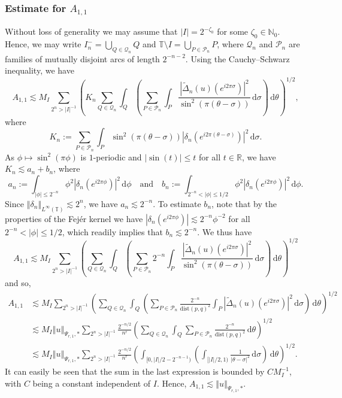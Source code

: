 \documentclass[a4paper, leqno, 10pt]{amsart}
\numberwithin{equation}{section}
\newcommand{\dd}{\mathrm{d}}
\newcommand{\T}{\mathbb{T}}
\newcommand{\R}{\mathbb{R}}
\newcommand{\norm}[1]{\left\Vert#1\right\Vert}
\newcommand{\abs}[1]{\left|#1\right|}
\newcommand{\N}{\mathbb{N}}
\begin{document}
\subsubsection*{Estimate for $A_{1,1}$}
%
Without loss of generality we may assume that $| I | = 2^{-\zeta_0}$ for some $\zeta_0 \in \N_0$. Hence, we may write $ I_n^- = \bigcup_{Q \in \mathcal{Q}_n} Q$ and $ \T \setminus I = \bigcup_{P \in \mathcal{P}_n} P$, where $\mathcal{Q}_n$ and $\mathcal{P}_n$ are families of mutually disjoint arcs of length $2^{-n-2}$. Using the Cauchy--Schwarz inequality, 
we have 
\[
A_{1,1}  \lesssim  
M_I  \sum_{ 2^n > | I |^{-1} }  \left( K_n  \sum_{Q \in \mathcal{Q}_n } \int_Q  \left( \sum_{P \in \mathcal{P}_n } \int_P \frac{ \abs{ \widetilde{\Delta}_n (u) (e^{i 2 \pi \sigma}) }^2 }{ \sin^2 (   \pi (\theta-\sigma) ) } \, \dd \sigma \right)   \, \dd \theta \right)^{1/2} ,
\] 
where
\[
K_n:=  \sum_{P \in \mathcal{P}_n }  \int_P \sin^2 (   \pi (\theta-\sigma) ) \abs{ \delta_n \left( e^{i 2 \pi (\theta - \sigma )} \right) }^2 \, \dd \sigma .
\]
As $\phi \mapsto \sin^2 (   \pi \phi )$ is $1$-periodic and $|\sin (t)| \leq t$ for all $t \in \R$, we have $
K_n \lesssim a_n + b_n $, 
where
\[
a_n := \int_{ | \phi | \leq 2^{-n} }  \phi^2  \abs{ \delta_n \left( e^{i 2 \pi \phi } \right) }^2 \, \dd \phi   \quad \text{and} \quad
b_n :=  \int_{ 2^{-n} <  | \phi | \leq  1/2 }  \phi^2  \abs{ \delta_n \left( e^{i 2 \pi \phi } \right) }^2 \, \dd \phi  .
\]
Since $\norm{\delta_n}_{L^{\infty}(\T)} \lesssim 2^n $, we have
$ 
a_n \lesssim  2^{-n}$.
To estimate $b_n$, note that by the properties of the Fej\'er kernel we have $ \abs{ \delta_n \left( e^{i 2 \pi \phi } \right) } \lesssim 2^{-n}  \phi^{-2} $ for all $2^{-n} <  | \phi | \leq  1/2$, 
which readily implies that $b_n \lesssim  2^{-n}$. We thus have
\[
A_{1,1} \lesssim
M_I \sum_{ 2^n > | I |^{-1} }  \left( \sum_{Q \in \mathcal{Q}_n }   \int_Q  \left( \sum_{P \in \mathcal{P}_n } 2^{-n} \int_P \frac{ \abs{ \widetilde{\Delta}_n (u) (e^{i 2 \pi \sigma}) }^2 }{ \sin^2 (   \pi (\theta-\sigma) ) } \, \dd \sigma \right) \, \dd \theta \right)^{1/2} 
\]
and so,
\begin{align*}
A_{1,1} & \lesssim M_I \sum_{ 2^n > | I |^{-1} } \left( \sum_{Q \in \mathcal{Q}_n } \int_Q \left( \sum_{P \in \mathcal{P}_n } \frac{2^{-n}}{ \mathrm{dist}(p,q)^2}  \int_P \abs{ \widetilde{\Delta}_n (u) (e^{i 2 \pi \sigma}) }^2  \, \dd \sigma \right) \, \dd \theta \right)^{1/2} \\
& \lesssim M_I \norm{u}_{\Psi_{r,1}, \ast}  \sum_{ 2^n > | I |^{-1} } \frac{2^{-n/2}}{n^r}  \left( \sum_{Q \in \mathcal{Q}_n } \int_Q  \sum_{P \in \mathcal{P}_n} \frac{2^{-n}}{\mathrm{dist}(p,q)^2} \, \dd \theta \right)^{1/2} \\
& \lesssim M_I \norm{u}_{\Psi_{r,1}, \ast}  \sum_{ 2^n > | I |^{-1} }  \frac{2^{-n/2}}{n^r}  \left(  \int_{ [0, | I |/2 - 2^{-n-1} ) } \left( \int_{ [ | I |/2, 1) }  \frac{ 1 }{  | \theta-\sigma |^2 } \, \dd \sigma \right)  \, \dd \theta \right)^{1/2} .
\end{align*}
It can easily be seen that the sum in the last expression is bounded by $C M_I^{-1}$, with $C$ being a constant independent of $I$. Hence, $A_{1,1} \lesssim   \norm{u}_{\Psi_{r,1}, \ast}$.
\end{document}
